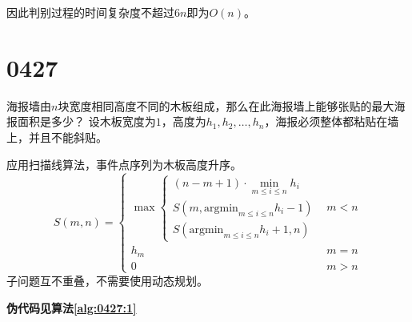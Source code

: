 \documentclass[answers]{exam}
\begin{document}
\begin{questions}
\begin{solution}
        因此判别过程的时间复杂度不超过$6n$即为$O(n)$。
    \end{solution}


    \newpage %
    \section{0427}\label{sec:0427}
    \question 海报墙由$n$块宽度相同高度不同的木板组成，那么在此海报墙上能够张贴的最大海报面积是多少？
    设木板宽度为$1$，高度为$h_1,h_2, \dots ,h_n$，海报必须整体都粘贴在墙上，并且不能斜贴。

    \begin{figure}[H]
        \centering
    \end{figure}

    \begin{solution}
        应用扫描线算法，事件点序列为木板高度升序。
        \[
            S(m,n) = \begin{cases}
                \max \begin{cases}
                    (n-m+1) \cdot \min_{m \le i \le n}{h_i}      \\
                    S(m,\mathrm{argmin}_{m \le i \le n}{h_i} -1) \\
                    S(\mathrm{argmin}_{m \le i \le n}{h_i} + 1, n)
                \end{cases} & m < n \\
                h_m                             & m = n \\
                0                               & m > n
            \end{cases}
        \]
        子问题互不重叠，不需要使用动态规划。

        \textbf{伪代码见算法\ref{alg:0427:1}}
    \end{solution}


\end{questions}
\end{document}
